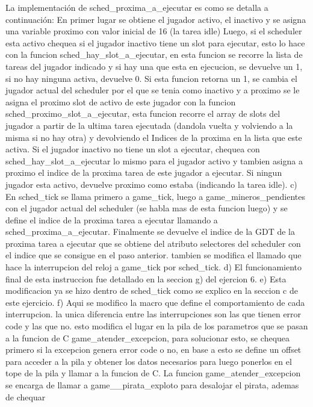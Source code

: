 La implementación de sched_proxima_a_ejecutar es como se detalla a
continuación:
  En primer lugar se obtiene el jugador activo, el inactivo y se asigna una variable proximo con valor inicial de 16 (la tarea idle)
  Luego, si el scheduler esta activo chequea si el jugador inactivo tiene un slot para ejecutar, esto lo hace con la
  funcion sched_hay_slot_a_ejecutar, en esta funcion se recorre la lista de tareas del jugador indicado y si hay una que esta
  en ejecucion, se devuelve un 1, si no hay ninguna activa, devuelve 0.
  Si esta funcion retorna un 1, se cambia el jugador actual del scheduler por el que se tenia como inactivo y a proximo se le asigna
  el proximo slot de activo de este jugador con la funcion sched_proximo_slot_a_ejecutar, esta funcion recorre el array de slots
  del jugador a partir de la ultima tarea ejecutada (dandola vuelta y volviendo a la misma si no hay otra) y devolviendo el Indices
  de la proxima en la lista que este activa.
  Si el jugador inactivo no tiene un slot a ejecutar, chequea con sched_hay_slot_a_ejecutar lo mismo para el jugador activo y
  tambien asigna a proximo el indice de la proxima tarea de este jugador a ejecutar.
  Si ningun jugador esta activo, devuelve proximo como estaba (indicando la tarea idle).
c) En sched_tick se llama primero a game_tick, luego a game_mineros_pendientes con el jugador actual del scheduler (se habla mas
  de esta funcion luego) y se define el indice de la proxima tarea a ejecutar llamando a sched_proxima_a_ejecutar.
  Finalmente se devuelve el indice de la GDT de la proxima tarea a ejecutar que se obtiene del atributo selectores del scheduler
  con el indice que se consigue en el paso anterior. tambien se modifica el llamado que hace la interrupcion del reloj a game_tick
  por sched_tick.
d) El funcionamiento final de esta instruccion fue detallado en la seccion g) del ejercion 6.
e) Esta modificacion ya se hizo dentro de sched_tick como se explico en la seccion c de este ejercicio.
f) Aqui se modifico la macro que define el comportamiento de cada interrupcion. la unica diferencia entre las interrupciones
  son las que tienen error code y las que no. esto modifica el lugar en la pila de los parametros que se pasan a la funcion de C
  game_atender_excepcion, para solucionar esto, se chequea primero si la excepcion genera error code o no, en base a esto se define un
  offset para acceder a la pila y obtener los datos necesarios para luego ponerlos en el tope de la pila y llamar a la funcion de C.
  La funcion game_atender_excepcion se encarga de llamar a game__pirata_exploto para desalojar el pirata, ademas de chequar
